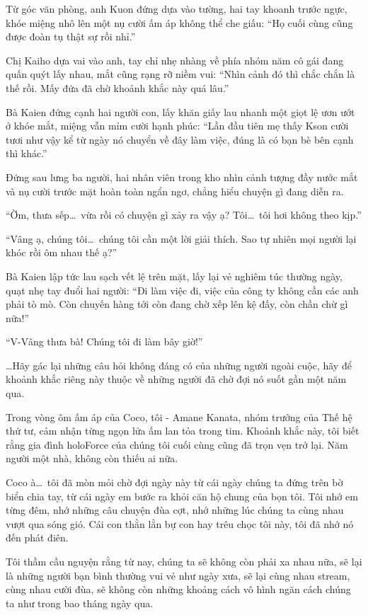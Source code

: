 \documentclass[../main.tex]{subfiles}
\begin{document}
Từ góc văn phòng, anh Kuon đứng dựa vào tường, hai tay khoanh trước ngực, khóe miệng nhô lên một nụ cười ấm áp không thể che giấu: ``Họ cuối cùng cũng được đoàn tụ thật sự rồi nhỉ.''

Chị Kaiho dựa vai vào anh, tay chỉ nhẹ nhàng về phía nhóm năm cô gái đang quấn quýt lấy nhau, mắt cũng rạng rỡ niềm vui: ``Nhìn cảnh đó thì chắc chắn là thế rồi. Mấy đứa đã chờ khoảnh khắc này quá lâu.''

Bà Kaien đứng cạnh hai người con, lấy khăn giấy lau nhanh một giọt lệ ươn ướt ở khóe mắt, miệng vẫn mỉm cười hạnh phúc: ``Lần đầu tiên mẹ thấy Kson cười tươi như vậy kể từ ngày nó chuyển về đây làm việc, đúng là có bạn bè bên cạnh thì khác.''

Đứng sau lưng ba người, hai nhân viên trong kho nhìn cảnh tượng đầy nước mắt và nụ cười trước mặt hoàn toàn ngẩn ngơ, chẳng hiểu chuyện gì đang diễn ra.

``Ờm, thưa sếp\dots\ vừa rồi có chuyện gì xảy ra vậy ạ? Tôi\dots\ tôi hơi không theo kịp.''

``Vâng ạ, chúng tôi\dots\ chúng tôi cần một lời giải thích. Sao tự nhiên mọi người lại khóc rồi ôm nhau thế ạ?''

Bà Kaien lập tức lau sạch vết lệ trên mặt, lấy lại vẻ nghiêm túc thường ngày, quạt nhẹ tay đuổi hai người: ``Đi làm việc đi, việc của công ty không cần các anh phải tò mò. Còn chuyến hàng tới  còn đang chờ xếp lên kệ đấy, còn chần chừ gì nữa!''

``V-Vâng thưa bà! Chúng tôi đi làm bây giờ!''

\dots Hãy gác lại những câu hỏi không đáng có của những người ngoài cuộc, hãy để khoảnh khắc riêng này thuộc về những người đã chờ đợi nó suốt gần một năm qua.

Trong vòng ôm ấm áp của Coco, tôi - Amane Kanata, nhóm trưởng của Thế hệ thứ tư, cảm nhận từng ngọn lửa ấm lan tỏa trong tim. Khoảnh khắc này, tôi biết rằng gia đình holoForce của chúng tôi cuối cùng cũng đã trọn vẹn trở lại. Năm người một nhà, không còn thiếu ai nữa.

Coco à\dots\ tôi đã mòn mỏi chờ đợi ngày này từ cái ngày chúng ta đứng trên bờ biển chia tay, từ cái ngày em bước ra khỏi căn hộ chung của bọn tôi. Tôi nhớ em từng đêm, nhớ những câu chuyện đùa cợt, nhớ những lúc chúng ta cùng nhau vượt qua sóng gió. Cái con thằn lằn bự con hay trêu chọc tôi này, tôi đã nhớ nó đến phát điên.

Tôi thầm cầu nguyện rằng từ nay, chúng ta sẽ không còn phải xa nhau nữa, sẽ lại là những người bạn bình thường vui vẻ như ngày xưa, sẽ lại cùng nhau stream, cùng nhau cười đùa, sẽ không còn những khoảng cách vô hình ngăn cách chúng ta như trong bao tháng ngày qua.
\end{document}
